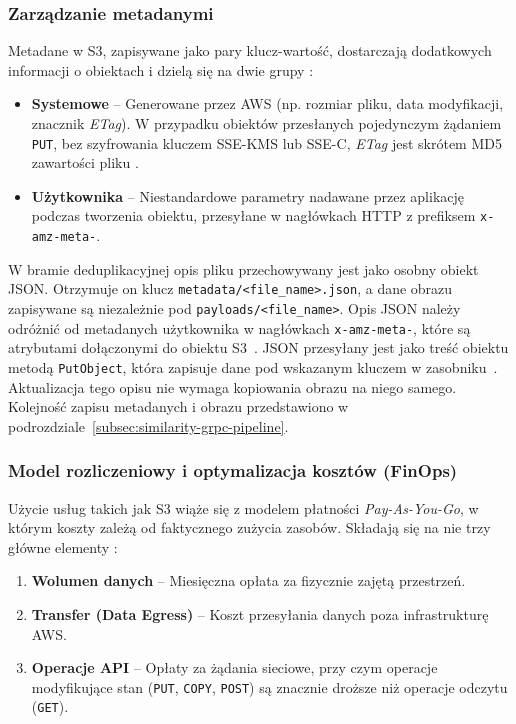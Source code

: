 \subsubsection{Zarządzanie metadanymi}


Metadane w S3, zapisywane jako pary klucz-wartość, dostarczają dodatkowych informacji o obiektach i dzielą się na dwie grupy \cite{aws_s3_service, aws_s3_welcome_doc}:
\begin{itemize}
    \item \textbf{Systemowe} -- Generowane przez AWS (np. rozmiar pliku, data modyfikacji, znacznik \textit{ETag}). W przypadku obiektów przesłanych pojedynczym żądaniem \texttt{PUT}, bez szyfrowania kluczem SSE-KMS lub SSE-C, \textit{ETag} jest skrótem MD5 zawartości pliku \cite{aws_s3_integrity}.
    \item \textbf{Użytkownika} -- Niestandardowe parametry nadawane przez aplikację podczas tworzenia obiektu, przesyłane w nagłówkach HTTP z prefiksem \texttt{x-amz-meta-}.
\end{itemize}


W bramie deduplikacyjnej opis pliku przechowywany jest jako osobny obiekt JSON. Otrzymuje on klucz \texttt{metadata/\allowbreak<file\_name>.json}, a dane obrazu zapisywane są niezależnie pod \texttt{payloads/\allowbreak<file\_name>}. Opis JSON należy odróżnić od metadanych użytkownika w nagłówkach \texttt{x-amz-meta-}, które są atrybutami dołączonymi do obiektu S3~\cite{aws_s3_object_metadata}. JSON przesyłany jest jako treść obiektu metodą \texttt{PutObject}, która zapisuje dane pod wskazanym kluczem w zasobniku~\cite{aws_s3_put_object}. Aktualizacja tego opisu nie wymaga kopiowania obrazu na niego samego. Kolejność zapisu metadanych i obrazu przedstawiono w podrozdziale~\ref{subsec:similarity-grpc-pipeline}.


\subsubsection{Model rozliczeniowy i optymalizacja kosztów (FinOps)}


Użycie usług takich jak S3 wiąże się z modelem płatności \textit{Pay-As-You-Go}, w którym koszty zależą od faktycznego zużycia zasobów. Składają się na nie trzy główne elementy \cite{aws_s3_service, aws_s3_welcome_doc}:
\begin{enumerate}
    \item \textbf{Wolumen danych} -- Miesięczna opłata za fizycznie zajętą przestrzeń.
    \item \textbf{Transfer (Data Egress)} -- Koszt przesyłania danych poza infrastrukturę AWS.
    \item \textbf{Operacje API} -- Opłaty za żądania sieciowe, przy czym operacje modyfikujące stan (\texttt{PUT}, \texttt{COPY}, \texttt{POST}) są znacznie droższe niż operacje odczytu (\texttt{GET}).
\end{enumerate}


